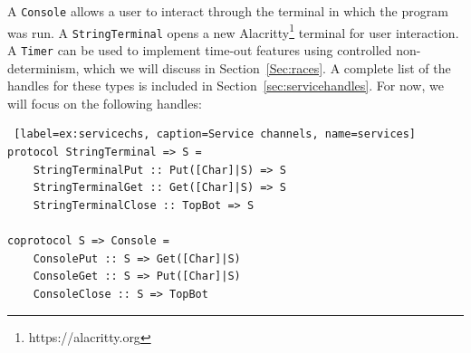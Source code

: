 \documentclass[11pt]{article}
\begin{document}
A \lstinline$Console$ allows a user to interact through the terminal in which the program was run.
A \lstinline$StringTerminal$ opens a new Alacritty\footnote{https://alacritty.org} terminal for user interaction.
A \lstinline$Timer$ can be used to implement time-out features using controlled non-determinism, which we will discuss in Section~\ref{Sec:races}.
A complete list of the handles for these types is included in Section~\ref{sec:servicehandles}.
For now, we will focus on the following handles:
\begin{lstlisting} [label=ex:servicechs, caption=Service channels, name=services] 
protocol StringTerminal => S =
    StringTerminalPut :: Put([Char]|S) => S
    StringTerminalGet :: Get([Char]|S) => S 
    StringTerminalClose :: TopBot => S
    
coprotocol S => Console =
    ConsolePut :: S => Get([Char]|S) 
    ConsoleGet :: S => Put([Char]|S) 
    ConsoleClose :: S => TopBot 
\end{lstlisting}
\end{document}
